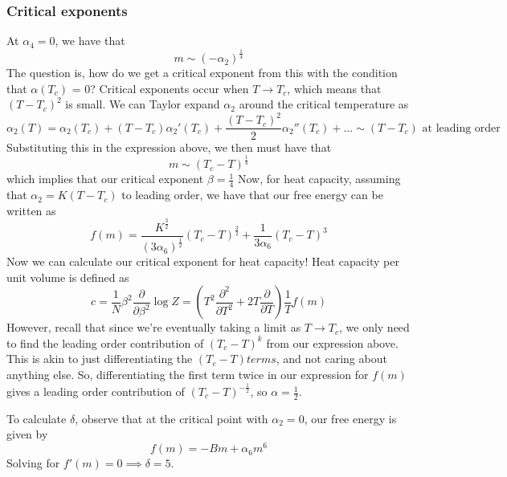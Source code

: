 \documentclass[11pt, oneside]{article}   	%
\begin{document}
\subsubsection*{Critical exponents} 
At $\alpha_4 = 0$, we have that 
\[ 
m \sim ( - \alpha_2)^{ \frac{ 1}{ 4} }  
\] 
The question is, how do we get a critical exponent from this with the condition that $\alpha(T_c)$  = 0? Critical exponents occur when $T \rightarrow T_c$, which means that $( T  - T_c)^2$ is small. We can Taylor expand $\alpha_2$ around the critical temperature as
\[ 
\alpha_ 2( T ) = \alpha_2(T_c) + ( T - T_c ) \alpha_2'(T_c) + \frac{ ( T - T_c)^2}{ 2} \alpha_2''(T_c) + \dots \sim ( T  - T_c) \text{ at leading order }
\] 
Substituting this in the expression above, we then must have that 
\[ 
m \sim ( T_c - T )^{ \frac{1}{4} } 
\] which implies that our critical exponent $\beta = \frac{1}{ 4} $ Now, for heat capacity, assuming that $\alpha_2 = K(T  - T_c ) $ to leading order, we have that our free energy can be written as 
\[ 
f(m) = \frac{  K^{ \frac{3}{2} } }{ ( 3 \alpha_6 )^ \frac{ 1}{ 2}}(  T_c - T )^{ \frac{3}{2}} + \frac{1 }{ 3 \alpha_6 } (T_c  - T )^3 
\] Now we can calculate our critical exponent for heat capacity! Heat capacity per unit volume is defined as 
\[ 
c = \frac{1}{N } \beta^2 \frac{ \partial }{ \partial \beta^2 } \log Z  = \left(  T^2 \frac{ \partial^2 }{ \partial T^2 } + 2T \frac{ \partial }{ \partial T } \right) \frac{ 1}{ T} f(m)
\] However, recall that since we're eventually taking a limit as $T \rightarrow T_c$, we only need to find the leading order contribution of $(T_c - T)^k$ from our expression above. This is akin to just differentiating the $( T_c - T ) terms $, and not caring about anything else. So, differentiating the first term twice in our expression for $f(m)$ gives a leading order contribution of $(T_c  - T)^{ - \frac{ 1}{2} } $, so $\alpha  = \frac{ 1}{2} $. 

To calculate $\delta$, observe that at the critical point with $\alpha_2 = 0$, our free energy is given by 
\[ 
f(m ) =  -B m + \alpha_6 m^6 
\] Solving for $f'(m) = 0 \implies \delta = 5$.  
\end{document}
